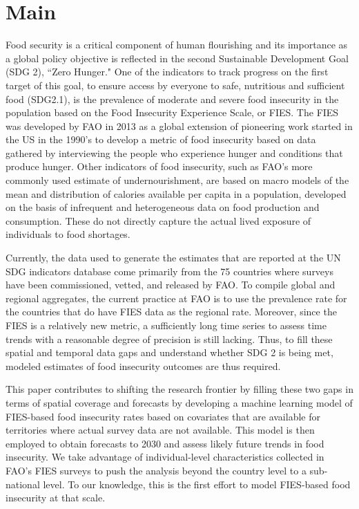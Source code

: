 \documentclass[titlepage]{article}
\begin{document}
\section{Main}
Food security is a critical component of human flourishing and its importance as a global policy objective is reflected in the second Sustainable Development Goal (SDG 2), ``Zero Hunger." One of the indicators to track progress on the first target of this goal, to ensure access by everyone to safe, nutritious and sufficient food (SDG2.1), is the prevalence of moderate and severe food insecurity in the population based on the Food Insecurity Experience Scale, or FIES. The FIES was developed by FAO in 2013 as a global extension of pioneering work started in the US in the 1990's to develop a metric of food insecurity based on data gathered by interviewing the people who experience hunger and conditions that produce hunger. Other indicators of food insecurity, such as FAO's more commonly used estimate of undernourishment, are based on macro models of the mean and distribution of calories available per capita in a population, developed on the basis of infrequent and heterogeneous data on food production and consumption. These do not directly capture the actual lived exposure of individuals to food shortages. 

Currently, the data used to generate the estimates that are reported at the UN SDG indicators database come primarily from the 75 countries where surveys have been commissioned, vetted, and released by FAO. To compile global and regional aggregates, the current practice at FAO is to use the prevalence rate for the countries that do have FIES data as the regional rate.  Moreover, since the FIES is a relatively new metric, a sufficiently long time series to assess time trends with a reasonable degree of precision is still lacking. Thus, to fill these spatial and temporal data gaps and understand whether SDG 2 is being met, modeled estimates of food insecurity outcomes are thus required.

This paper contributes to shifting the research frontier by filling these two gaps in terms of spatial coverage and forecasts by developing a machine learning model of FIES-based food insecurity rates based on covariates that are available for territories where actual survey data are not available. This model is then employed to obtain forecasts to 2030 and assess likely future trends in food insecurity. We take advantage of individual-level characteristics collected in FAO's FIES surveys to push the analysis beyond the country level to a sub-national level. To our knowledge, this is the first effort to model FIES-based food insecurity at that scale.
\end{document}
